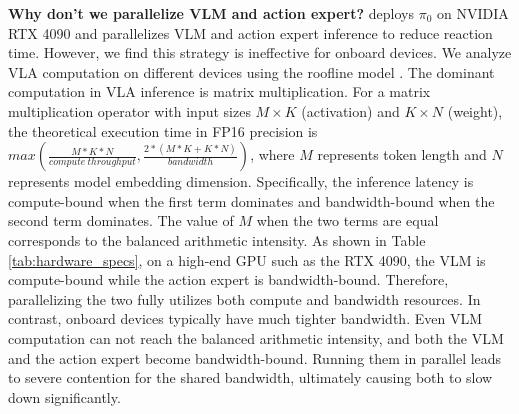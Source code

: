 \begin{table}[t]
\centering
\caption{Hardware specifications and roofline analysis of different computing devices.}
\label{tab:hardware_specs}
\end{table}

\textbf{Why don't we parallelize VLM and action expert?} 
\cite{ma2025running} deploys $\pi_0$ on NVIDIA RTX 4090 and parallelizes VLM and action expert inference to reduce reaction time. However, we find this strategy is ineffective for onboard devices. 
We analyze VLA computation on different devices using the roofline model \cite{yuan2026fast,guo2024hg}. The dominant computation in VLA inference is matrix multiplication. For a matrix multiplication operator with input sizes $M\times K$ (activation) and $K\times N$ (weight), the theoretical execution time in FP16 precision is $max(\frac{M*K*N}{compute~throughput},\frac{2*(M*K+K*N)}{bandwidth})$, where $M$ represents token length and $N$ represents model embedding dimension.
Specifically, the inference latency is compute-bound when the first term dominates and bandwidth-bound when the second term dominates. 
The value of $M$ when the two terms are equal corresponds to the balanced arithmetic intensity.
As shown in Table \ref{tab:hardware_specs}, on a high-end GPU such as the RTX 4090, the VLM is compute-bound while the action expert is bandwidth-bound. Therefore, parallelizing the two fully utilizes both compute and bandwidth resources. In contrast, onboard devices typically have much tighter bandwidth. Even VLM computation can not reach the balanced arithmetic intensity, and both the VLM and the action expert become bandwidth-bound. Running them in parallel leads to severe contention for the shared bandwidth, ultimately causing both to slow down significantly.



